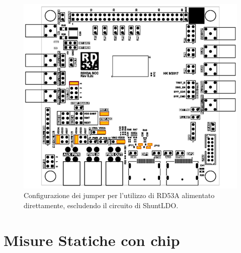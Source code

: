 \begin{figure}
\centering
\includegraphics[scale=.3]{Immagini/DirectPowering}
\caption{Configurazione dei jumper per l'utilizzo di RD53A alimentato direttamente, escludendo il circuito di ShuntLDO.}
\label{DirectPowering}
\end{figure}


\section{Misure Statiche con chip}

